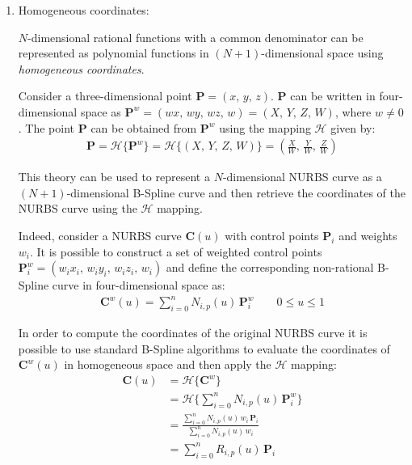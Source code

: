 \begin{enumerate}
    
    \item Homogeneous coordinates:
    
    $N$-dimensional rational functions with a common denominator can be represented as polynomial functions in $(N+1)$-dimensional space using \textit{homogeneous coordinates}.
    
    Consider a three-dimensional point $\mathbf{P}=(x,\, y,\, z)$. $\mathbf{P}$ can be written in four-dimensional space as $\mathbf{P}^w=(wx,\, wy,\, wz,\, w) = (X,\, Y,\, Z,\, W)$, where $w \neq 0$.
    The point $\mathbf{P}$ can be obtained from $\mathbf{P}^w$ using the mapping $\mathcal{H}$ given by:
    \begin{align*}
        \mathbf{P} = \mathcal{H}\{\mathbf{P}^w\} =  \mathcal{H}\{(X,\, Y,\, Z,\, W)\} = \left( \frac{X}{W},\, \frac{Y}{W},\, \frac{Z}{W}\right)
    \end{align*}
    
    This theory can be used to represent a $N$-dimensional NURBS curve as a $(N+1)$-dimensional B-Spline curve and then retrieve the coordinates of the NURBS curve using the $\mathcal{H}$ mapping.
    
    Indeed, consider a NURBS curve $\mathbf{C}(u)$ with control points $\mathbf{P}_{i}$ and weights $w_{i}$. It is possible to construct a set of weighted control points $\mathbf{P}^{w}_{i} = (w_{i}x_{i},\, w_{i}y_{i},\, w_{i}z_{i},\, w_{i})$ and define the corresponding non-rational B-Spline curve in four-dimensional space as:
    \begin{align*}
        \mathbf{C}^{w}(u)=\sum_{i=0}^{n} N_{i,p}(u)\, \mathbf{P}^{w}_{i} \quad \quad 0 \leq u \leq 1
    \end{align*}
    
    In order to compute the coordinates of the original NURBS curve it is possible to use standard B-Spline algorithms to evaluate the coordinates of $\mathbf{C}^{w}(u)$ in homogeneous space and then apply the $\mathcal{H}$ mapping:
    \begin{align*}
        \mathbf{C}(u) &= \mathcal{H}\{\mathbf{C}^w\} \\
        &=  \mathcal{H} \bigg\{ \sum_{i=0}^{n} N_{i,p}(u)\, \mathbf{P}^{w}_{i} \bigg\} \\
        &= \frac{\sum\limits_{i=0}^{n} N_{i,p}(u)\, w_{i} \,\mathbf{P}_{i}}{\sum\limits_{i=0}^{n} N_{i,p}(u)\, w_{i}} \\
        &= \sum_{i=0}^{n} R_{i,p}(u) \, \mathbf{P}_{i}
    \end{align*}
    

\end{enumerate}
